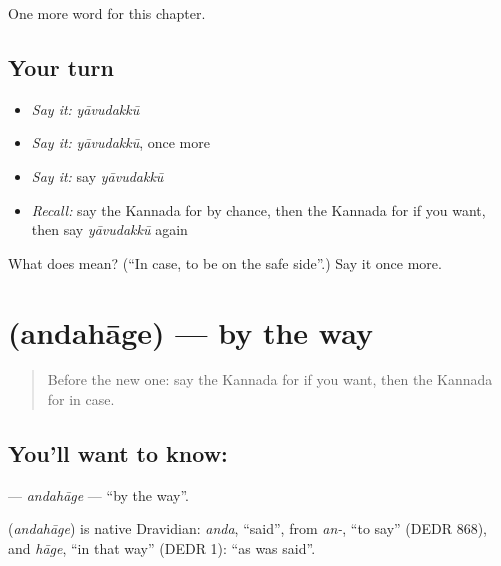 \begin{grammarlens}[title={What you've built}]
One more word for this chapter.
\end{grammarlens}

\subsection*{Your turn}
\begin{itemize}
\raggedright
  \item \emph{Say it:} \emph{yāvudakkū}
  \item \emph{Say it:} \emph{yāvudakkū}, once more
  \item \emph{Say it:} say \emph{yāvudakkū}
  \item \emph{Recall:} say the Kannada for by chance, then the Kannada for if you want, then say \emph{yāvudakkū} again
\end{itemize}

\begin{tcolorbox}[breakable,colback=teal!4,colframe=teal!35!black,title={Before you move on}]
What does  mean? (\textquotedblleft{}In case, to be on the safe side\textquotedblright{}.) Say it once more.
\end{tcolorbox}
\section[\texorpdfstring{\kn{ಅಂದಹಾಗೆ} (andahāge)}{ಅಂದಹಾಗೆ (andahāge)}]{ (andahāge) — by the way}

\label{lesson:KA-C178-andahage}



\begin{quote}
Before the new one: say the Kannada for if you want, then the Kannada for in case.
\end{quote}

\subsection*{You'll want to know: }
\textbf{} — \emph{andahāge} — \textquotedblleft{}by the way\textquotedblright{}.

\begin{cousinweb}
\textbf{} (\emph{andahāge}) is native Dravidian: \emph{anda}, \textquotedblleft{}said\textquotedblright{}, from \emph{an-}, \textquotedblleft{}to say\textquotedblright{} (DEDR 868), and \emph{hāge}, \textquotedblleft{}in that way\textquotedblright{} (DEDR 1): \textquotedblleft{}as was said\textquotedblright{}.
\end{cousinweb}

